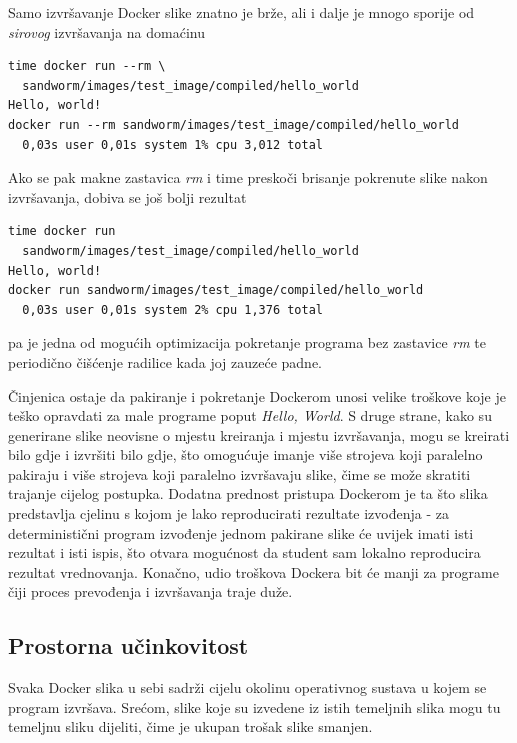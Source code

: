 \documentclass[times, utf8, zavrsni]{fer}
\begin{document}
{{Samo izvršavanje Docker slike znatno je brže, ali i dalje je mnogo sporije od {\textit{sirovog}} izvršavanja na domaćinu

\begin{lstlisting}
time docker run --rm \
  sandworm/images/test_image/compiled/hello_world
Hello, world!
docker run --rm sandworm/images/test_image/compiled/hello_world
  0,03s user 0,01s system 1% cpu 3,012 total
\end{lstlisting}

Ako se pak makne zastavica {\textit{rm}} i time preskoči brisanje pokrenute slike nakon izvršavanja, dobiva se još bolji rezultat

\begin{lstlisting}
time docker run
  sandworm/images/test_image/compiled/hello_world 
Hello, world!
docker run sandworm/images/test_image/compiled/hello_world
  0,03s user 0,01s system 2% cpu 1,376 total
\end{lstlisting}

pa je jedna od mogućih optimizacija pokretanje programa bez zastavice {\textit{rm}} te periodično čišćenje radilice kada joj zauzeće padne.

Činjenica ostaje da pakiranje i pokretanje Dockerom unosi velike troškove koje je teško opravdati za male programe poput {\textit{Hello, World}}. S druge strane, kako su generirane slike neovisne o mjestu kreiranja i mjestu izvršavanja, mogu se kreirati bilo gdje i izvršiti bilo gdje, što omogućuje imanje više strojeva koji paralelno pakiraju i više strojeva koji paralelno izvršavaju slike, čime se može skratiti trajanje cijelog postupka. Dodatna prednost pristupa Dockerom je ta što slika predstavlja cjelinu s kojom je lako reproducirati rezultate izvođenja - za deterministični program izvođenje jednom pakirane slike će uvijek imati isti rezultat i isti ispis, što otvara mogućnost da student sam lokalno reproducira rezultat vrednovanja. Konačno, udio troškova Dockera bit će manji za programe čiji proces prevođenja i izvršavanja traje duže.

\subsection{Prostorna učinkovitost}

Svaka Docker slika u sebi sadrži cijelu okolinu operativnog sustava u kojem se program izvršava. Srećom, slike koje su izvedene iz istih temeljnih slika mogu tu temeljnu sliku dijeliti, čime je ukupan trošak slike smanjen.

}}
\end{document}
